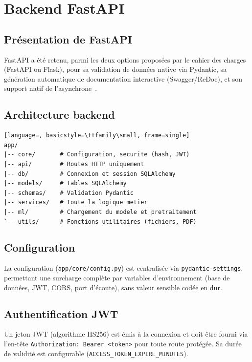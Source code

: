 \chapter{Backend FastAPI}
\label{ch:backend}

\section{Pr\'esentation de FastAPI}

FastAPI a \'et\'e retenu, parmi les deux options propos\'ees par le cahier des charges (FastAPI ou Flask), pour sa validation de donn\'ees native via Pydantic, sa g\'en\'eration automatique de documentation interactive (Swagger/ReDoc), et son support natif de l'asynchrone~\cite{fastapi}.

\section{Architecture backend}

\begin{lstlisting}[language=, basicstyle=\ttfamily\small, frame=single]
app/
|-- core/       # Configuration, securite (hash, JWT)
|-- api/        # Routes HTTP uniquement
|-- db/         # Connexion et session SQLAlchemy
|-- models/     # Tables SQLAlchemy
|-- schemas/    # Validation Pydantic
|-- services/   # Toute la logique metier
|-- ml/         # Chargement du modele et pretraitement
`-- utils/      # Fonctions utilitaires (fichiers, PDF)
\end{lstlisting}

\section{Configuration}

La configuration (\texttt{app/core/config.py}) est centralis\'ee via \texttt{pydantic-settings}, permettant une surcharge compl\`ete par variables d'environnement (base de donn\'ees, JWT, CORS, port d'\'ecoute), sans valeur sensible cod\'ee en dur.

\section{Authentification JWT}

Un jeton JWT (algorithme HS256) est \'emis \`a la connexion et doit \^etre fourni via l'en-t\^ete \texttt{Authorization: Bearer <token>} pour toute route prot\'eg\'ee. Sa dur\'ee de validit\'e est configurable (\texttt{ACCESS\_TOKEN\_EXPIRE\_MINUTES}).


